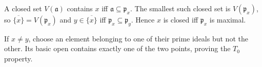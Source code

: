 A closed set $V(\mathfrak a)$ contains $x$ iff $\mathfrak a\subseteq\mathfrak p_x$. The smallest such closed set is $V(\mathfrak p_x)$, so $\overline{\{x\}}=V(\mathfrak p_x)$ and $y\in\overline{\{x\}}$ iff $\mathfrak p_x\subseteq\mathfrak p_y$. Hence $x$ is closed iff $\mathfrak p_x$ is maximal.

If $x\ne y$, choose an element belonging to one of their prime ideals but not the other. Its basic open contains exactly one of the two points, proving the $T_0$ property.
